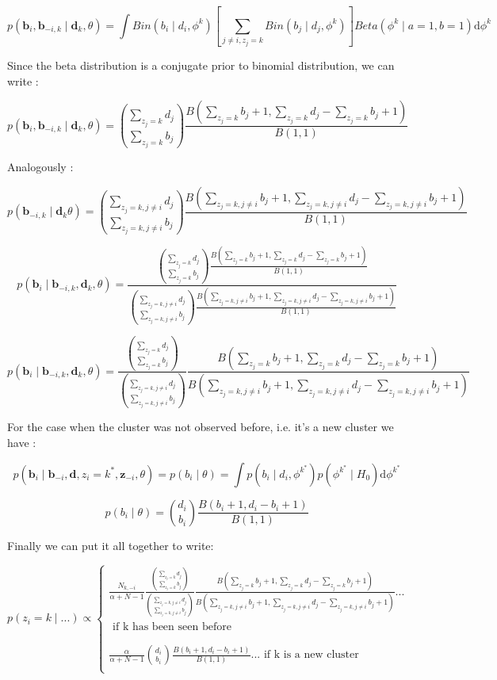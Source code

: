 \documentclass[]{article}
\begin{document}
	$$ p(\mathbf{b}_i,\mathbf{b}_{-i,k} \mid \mathbf{d}_k,\theta ) = \int Bin(b_i\mid d_i,\phi^k) \left[ \sum_{j \neq i, z_j=k} Bin(b_j\mid d_j,\phi^k) \right] Beta(\phi^k \mid a=1,b=1) \text{d} \phi^k$$ 
	
	
	Since the beta distribution is a conjugate prior to binomial distribution, we can write :
	
	$$ p(\mathbf{b}_i,\mathbf{b}_{-i,k} \mid \mathbf{d}_k,\theta ) = \binom{\sum_{z_j=k} d_j}{\sum_{z_j=k} b_j} \frac{B(\sum_{z_j=k} b_j + 1 , \sum_{z_j=k} d_j - \sum_{z_j=k} b_j +1)}{B(1,1)} $$ 
	
	
	
	Analogously :
	
	$$ p( \mathbf{b}_{-i,k} \mid \mathbf{d}_k \theta ) = \binom{\sum_{z_j=k,j \neq i} d_j}{\sum_{z_j=k,j \neq i} b_j} \frac{B(\sum_{z_j=k,j \neq i} b_j + 1 , \sum_{z_j=k,j \neq i} d_j - \sum_{z_j=k,j \neq i} b_j +1)}{B(1,1)} $$ 
	
	$$ p(\mathbf{b}_i \mid \mathbf{b}_{-i,k}, \mathbf{d}_k, \theta ) = \frac{\binom{\sum_{z_j=k} d_j}{\sum_{z_j=k} b_j} \frac{B(\sum_{z_j=k} b_j + 1 , \sum_{z_j=k} d_j - \sum_{z_j=k} b_j +1)}{B(1,1)}}{\binom{\sum_{z_j=k,j \neq i} d_j}{\sum_{z_j=k,j \neq i} b_j} \frac{B(\sum_{z_j=k,j \neq i} b_j + 1 , \sum_{z_j=k,j \neq i} d_j - \sum_{z_j=k,j \neq i} b_j +1)}{B(1,1)}} $$ 
	
	$$ p(\mathbf{b}_i \mid \mathbf{b}_{-i,k}, \mathbf{d}_k, \theta ) = \frac{\binom{\sum_{z_j=k} d_j}{\sum_{z_j=k} b_j}}{\binom{\sum_{z_j=k,j \neq i} d_j}{\sum_{z_j=k,j \neq i} b_j}} \frac{B(\sum_{z_j=k} b_j + 1 , \sum_{z_j=k} d_j - \sum_{z_j=k} b_j +1)}{B(\sum_{z_j=k,j \neq i} b_j + 1 , \sum_{z_j=k,j \neq i} d_j - \sum_{z_j=k,j \neq i} b_j +1)} $$ 
	
	For the case when the cluster was not observed before, i.e. it's a new cluster we have : 
	
	$$ p(\mathbf{b}_i \mid \mathbf{b}_{-i},\mathbf{d}, z_i = k^*, \mathbf{z}_{-i}, \theta ) = p(b_i \mid \theta ) = \int p(b_i\mid d_i,\phi^{k^*}) p(\phi^{k^*} \mid H_0) \text{d} \phi^{k^*} $$ 
	
	$$ p(b_i \mid \theta ) = \binom{d_i}{ b_i} \frac{B(b_i + 1 , d_i - b_i +1)}{B(1,1)} $$ 
	
	
	
	Finally we can put it all together to write:
	
	$$ p(z_i = k \mid ...) \propto      
	\begin{cases}
	\frac{N_{k,-i}}{\alpha + N -1}\frac{\binom{\sum_{z_j=k} d_j}{\sum_{z_j=k} b_j}}{\binom{\sum_{z_j=k,j \neq i} d_j}{\sum_{z_j=k,j \neq i} b_j}} \frac{B(\sum_{z_j=k} b_j + 1 , \sum_{z_j=k} d_j - \sum_{z_j=k} b_j +1)}{B(\sum_{z_j=k,j \neq i} b_j + 1 , \sum_{z_j=k,j \neq i} d_j - \sum_{z_j=k,j \neq i} b_j +1)} ...\\ 
	\text{ if k has been seen before}\\
	\\
	\\
	\frac{\alpha}{\alpha + N -1} \binom{d_i}{ b_i} \frac{B(b_i + 1 , d_i - b_i +1)}{B(1,1)} ... \text{ if k is a new cluster}\\
	\end{cases} $$
\end{document}
